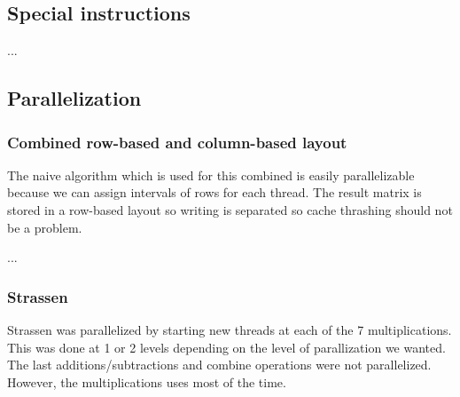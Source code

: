 \subsection{Special instructions}

...

\subsection{Parallelization}

\subsubsection{Combined row-based and column-based layout}

The naive algorithm which is used for this combined is easily parallelizable because we can assign intervals of rows for each thread. The result matrix is stored in a row-based layout so writing is separated so cache thrashing should not be a problem.

...



\subsubsection{Strassen}

Strassen was parallelized by starting new threads at each of the 7 multiplications. This was done at 1 or 2 levels depending on the level of parallization we wanted. The last additions/subtractions and combine operations were not parallelized. However, the multiplications uses most of the time.
